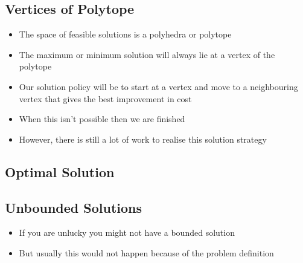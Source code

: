 \begin{slide}
\section{Vertices of Polytope}

\begin{PauseHighLight}
  \begin{itemize}
  \item The space of feasible solutions is a polyhedra or polytope\pause
  \item The maximum or minimum solution will always lie at a vertex of
    the polytope\pause
  \item Our solution policy will be to start at a vertex and move
    to a neighbouring vertex that gives the best improvement in cost\pause
  \item When this isn't possible then we are finished\pause
  \item However, there is still a lot of work to realise this solution
    strategy\pause
  \end{itemize}
\end{PauseHighLight}

\end{slide}



\begin{slide}
\section{Optimal Solution}

\pb
\pause {}
\begin{center}
  \pause
\end{center}
\end{slide}



\begin{slide}
\section[-2]{Unbounded Solutions}

\pb \pause
\begin{itemize}
\item If you are unlucky you might not have a bounded solution\pauseh {}
  \begin{center}
    \pause
  \end{center}
\item But usually this would not happen because of the problem definition\pause
\end{itemize}
\end{slide}


